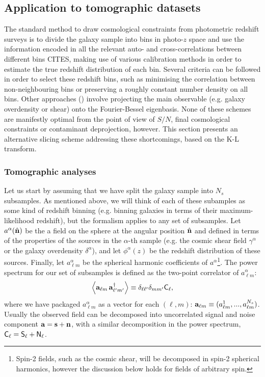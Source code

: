 \documentclass[twocolumn,amsfont,amssymb,amsmath, showpacs,balancelastpage, nofootinbib]{revtex4-1}
\newcommand{\nv}{\hat{\bf n}}
\begin{document}
  \subsection{Application to tomographic datasets}\label{ssec:method.tomographic}
    The standard method to draw cosmological constraints from photometric redshift surveys is to divide the galaxy sample into bins in photo-$z$ space and use the information encoded in all the relevant auto- and cross-correlations between different bins CITES, making use of various calibration methods in order to estimate the true redshift distribution of each bin. Several criteria can be followed in order to select these redshift bins, such as minimising the correlation between non-neighbouring bins or preserving a roughly constant number density on all bins. Other approaches
    (\cite{2003MNRAS.343.1327H,2007MNRAS.376..771K,2014MNRAS.442.1326K})
    involve projecting the main observable (e.g. galaxy overdensity or shear) onto the Fourier-Bessel eigenbasis. None of these schemes are manifestly optimal from the point of view of $S/N$, final cosmological constraints or contaminant deprojection, however. This section presents an alternative slicing scheme addressing these shortcomings, based on the K-L transform.
    
    \subsubsection{Tomographic analyses}\label{sssec:method.tomographic.st}
      Let us start by assuming that we have split the galaxy sample into $N_s$ subsamples. As mentioned above, we will think of each of these subamples as some kind of redshift binning (e.g. binning galaxies in terms of their maximum-likelihood redshift), but the formalism applies to any set of subsamples. Let $a^\alpha(\nv)$ be the a field on the sphere at the angular position $\nv$ and defined in terms of the properties of the sources in the $\alpha$-th sample (e.g. the cosmic shear field $\gamma^\alpha$ or the galaxy overdensity $\delta^\alpha$), and let $\phi^\alpha(z)$ be the redshift distribution of these sources. Finally, let $a^\alpha_{\ell m}$ be the spherical harmonic coefficients of $a^\alpha$\footnote{Spin-2 fields, such as the cosmic shear, will be decomposed in spin-2 spherical harmonics, however the discussion below holds for fields of arbitrary spin.}. The power spectrum for our set of subsamples is defined as the two-point correlator of $a^\alpha_{\ell m}$:
      \begin{equation}
        \left\langle {\bf a}_{\ell m}\,{\bf a}^\dag_{\ell' m'} \right\rangle\equiv\delta_{\ell\ell'}\delta_{mm'}{\sf C}_\ell,
      \end{equation}
      where we have packaged $a^\alpha_{\ell m}$ as a vector for each $(\ell,m)$: ${\bf a}_{\ell m}\equiv(a^1_{\ell m},...,a^{N_s}_{\ell m})$. Usually the observed field can be decomposed into uncorrelated signal and noise component ${\bf a}={\bf s}+{\bf n}$, with a similar decomposition in the power spectrum, ${\sf C}_\ell={\sf S}_\ell+{\sf N}_\ell$.
  
\end{document}
